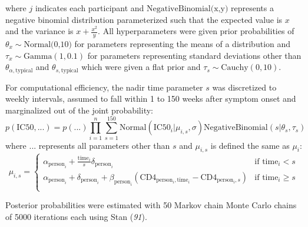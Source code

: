 \documentclass[12pt]{article}
\newcommand{\stanRef}{\textit{91}}
\begin{document}
where $j$ indicates each participant and $\text{NegativeBinomial(x,y)}$ represents a negative binomial distribution parameterized such that the expected value is $x$ and the variance is $x+\frac{x^2}{y}$. All hyperparameters were given prior probabilities of $\theta_x \sim \text{Normal(0,10)}$ for parameters representing the means of a distribution and $\tau_x \sim \text{Gamma}(1,0.1)$ for parameters representing standard deviations other than $\theta_{\alpha,\text{typical}}$ and $\theta_{s,\text{typical}}$ which were given a flat prior and $\tau_s \sim \text{Cauchy}(0,10)$.

For computational efficiency, the nadir time parameter $s$ was discretized to weekly intervals, assumed to fall within 1 to 150 weeks after symptom onset and marginalized out of the joint probability:
\[p(\text{IC50},\text{...})=p(\text{...})\prod_{i=1}^n\sum_{s=1}^{150}\text{Normal}(\text{IC50}_i|\mu_{i,s},\sigma)\text{NegativeBinomial}(s|\theta_s,\tau_s)\]
where $\text{...}$ represents all parameters other than $s$ and $\mu_{i,s}$ is defined the same as $\mu_i$:
\[\mu_{i,s}=\begin{cases}
    \alpha_{\text{person}_i}+\frac{\text{time}_i}{s}\delta_{\text{person}_i} & \text{if } \text{time}_i<s\\
    \alpha_{\text{person}_i}+\delta_{\text{person}_i} + \beta_{\text{person}_i}(\text{CD4}_{\text{person$_i$},\text{time}_i}-\text{CD4}_{\text{person$_i$},s}) & \text{if } \text{time}_i\ge s\\
  \end{cases}
\]

Posterior probabilities were estimated with 50 Markov chain Monte Carlo chains of 5000 iterations each using Stan (\stanRef{}).
\end{document}
